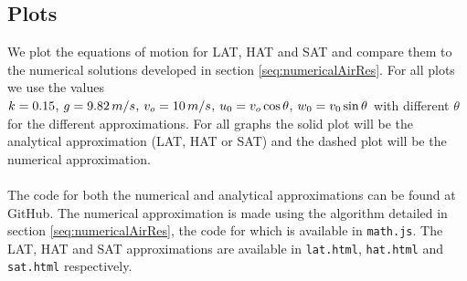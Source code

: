 \documentclass[%
aip,
jmp,
amsmath,amssymb,
reprint,%
]{revtex4-1}
\newcommand{\comma}{\hspace{0.1mm},\hspace{0.7mm}}
\begin{document}
	\subsection{Plots}
	We plot the equations of motion for LAT, HAT and SAT and compare them to the numerical solutions developed in section \ref{seq:numericalAirRes}. For all plots we use the values $k = 0.15 \comma g = 9.82\,m/s \comma v_o = 10\,m/s \comma u_0 = v_o\cos\theta \comma w_0 = v_0\sin\theta$ with different $\theta$ for the different approximations. For all graphs the solid plot will be the analytical approximation (LAT, HAT or SAT) and the dashed plot will be the numerical approximation.
	\\~\\
	The code for both the numerical and analytical approximations can be found at GitHub\cite{code}. The numerical approximation is made using the algorithm detailed in section \ref{seq:numericalAirRes}, the code for which is available in \texttt{math.js}. The LAT, HAT and SAT approximations are available in \texttt{lat.html}, \texttt{hat.html} and \texttt{sat.html} respectively.
\end{document}
